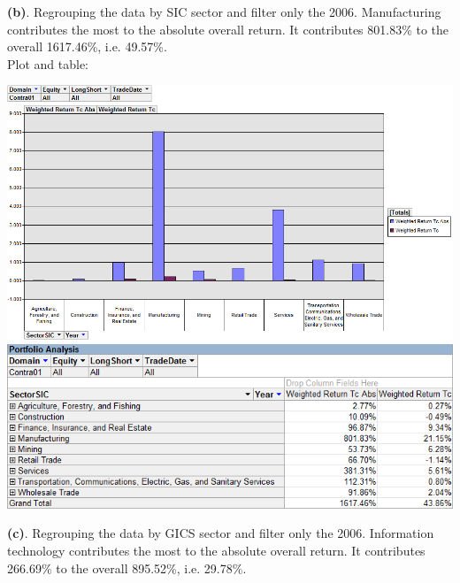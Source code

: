 \documentclass[11pt,letter]{article}
\begin{document}
\textbf{(b)}. Regrouping the data by SIC sector and filter only the 2006. Manufacturing contributes the most to the absolute overall return. It contributes 801.83\% to the overall 1617.46\%, i.e. 49.57\%.\\

Plot and table:
\begin{center}
\includegraphics[scale=0.5,keepaspectratio]{2b}
\includegraphics[scale=0.5,keepaspectratio]{2b_2}
\end{center}

\textbf{(c)}. Regrouping the data by GICS sector and filter only the 2006. Information technology contributes the most to the absolute overall return. It contributes 266.69\% to the overall 895.52\%, i.e. 29.78\%.\\
\end{document}
